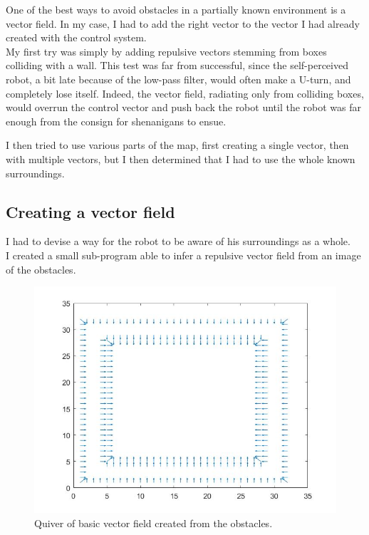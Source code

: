 One of the best ways to avoid obstacles in a partially known environment is a vector field.
In my case, I had to add the right vector to the vector I had already created with the control system.\\

My first try was simply by adding repulsive vectors stemming from boxes colliding with a wall.
This test was far from successful, since the self-perceived robot, a bit late because of the low-pass filter, would often make a U-turn, and completely lose itself.
Indeed, the vector field, radiating only from colliding boxes, would overrun the control vector and push back the robot until the robot was far enough from the consign for shenanigans to ensue.

I then tried to use various parts of the map, first creating a single vector, then with multiple vectors, but I then determined that I had to use the whole known surroundings.

\subsection{Creating a vector field}
\label{vectf}

I had to devise a way for the robot to be aware of his surroundings as a whole.\\



I created a small sub-program able to infer a repulsive vector field from an image of the obstacles.\\

\begin{figure}[H]
\centering
\includegraphics[scale=0.4]{Figures/quiver1}
\decoRule
\caption[Basic Quiver]{Quiver of basic vector field created from the obstacles.}
\label{fig:quiver1}
\end{figure}


